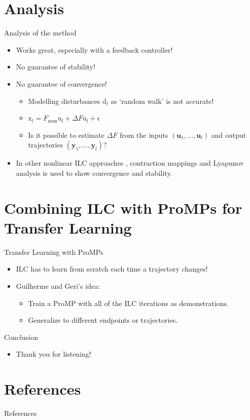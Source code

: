 \documentclass[handout]{beamer}
\newcommand{\sysInput}{\mathbf{u}} %
\newcommand{\observations}{\mathbf{y}} %
\newcommand{\liftedinput}{\mathrm{u}}
\newcommand{\liftedstate}{\mathrm{x}}
\newcommand{\disturbance}{\mathrm{d}}
\begin{document}
\section{Analysis}
%
\begin{frame}{Analysis of the method}
\begin{itemize}
\item Works great, especially with a feedback controller! \pause
\item No guarantee of stability! \pause
\item No guarantee of convergence! \pause
	\begin{itemize}
	\item Modelling disturbances $\disturbance_l$ as `random walk' is not accurate! \pause
	\item $\liftedstate_l = F_{\mathrm{nom}}\liftedinput_l + \Delta F \liftedinput_l + \epsilon$ \pause
	\item Is it possible to estimate $\Delta F$ from the inputs $(\sysInput_1, \ldots, \sysInput_l)$ and output trajectories $(\observations_1, \ldots, \observations_l)$? \pause
	\end{itemize}
\item In other nonlinear ILC approaches \cite{Xu}, contraction mappings and Lyapunov analysis is used to show convergence and stability.
\end{itemize}
\end{frame}
%
%
%
\section{Combining ILC with ProMPs for Transfer Learning}
%
\begin{frame}{Transfer Learning with ProMPs}
\begin{itemize}
\item ILC has to learn from scratch each time a trajectory changes! \pause
\item Guilherme and Geri's idea: \pause
\begin{itemize}
\item Train a ProMP with all of the ILC iterations as demonstrations. \pause
\item Generalize to different endpoints or trajectories.
\end{itemize}
\end{itemize}
\end{frame}	
%
\begin{frame}{Conclusion}
\begin{itemize}
\item Thank you for listening!
\end{itemize}
\end{frame}	
%
\section{References}
\begin{frame}[allowframebreaks]{References}
\def\newblock{\hskip .11em plus .33em minus .07em}

\end{frame}
%

%
\end{document}
